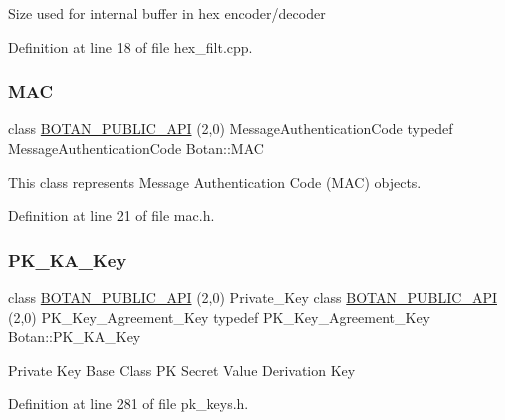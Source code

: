 Size used for internal buffer in hex encoder/decoder 

Definition at line 18 of file hex\+\_\+filt.\+cpp.

\mbox{\label{namespace_botan_aad9020384b0dc79f1bc8dcc59d5ee6fc}} 
\subsubsection{\texorpdfstring{M\+AC}{MAC}}
{\footnotesize\ttfamily class \mbox{\hyperlink{namespace_botan_a6b9388030d872e586a4655b776ac9501}{B\+O\+T\+A\+N\+\_\+\+P\+U\+B\+L\+I\+C\+\_\+\+A\+PI}} (2,0) Message\+Authentication\+Code typedef Message\+Authentication\+Code Botan\+::\+M\+AC}

This class represents Message Authentication Code (M\+AC) objects. 

Definition at line 21 of file mac.\+h.

\mbox{\label{namespace_botan_a137fc6f2c61b1ee506513b92b09618c6}} 
\subsubsection{\texorpdfstring{P\+K\+\_\+\+K\+A\+\_\+\+Key}{PK\_KA\_Key}}
{\footnotesize\ttfamily class \mbox{\hyperlink{namespace_botan_a6b9388030d872e586a4655b776ac9501}{B\+O\+T\+A\+N\+\_\+\+P\+U\+B\+L\+I\+C\+\_\+\+A\+PI}} (2,0) Private\+\_\+\+Key class \mbox{\hyperlink{namespace_botan_a6b9388030d872e586a4655b776ac9501}{B\+O\+T\+A\+N\+\_\+\+P\+U\+B\+L\+I\+C\+\_\+\+A\+PI}} (2,0) P\+K\+\_\+\+Key\+\_\+\+Agreement\+\_\+\+Key typedef P\+K\+\_\+\+Key\+\_\+\+Agreement\+\_\+\+Key Botan\+::\+P\+K\+\_\+\+K\+A\+\_\+\+Key}

Private Key Base Class PK Secret Value Derivation Key 

Definition at line 281 of file pk\+\_\+keys.\+h.

\mbox{\label{namespace_botan_a501e4632aed1ca4799b03efff7dc59d7}} 
